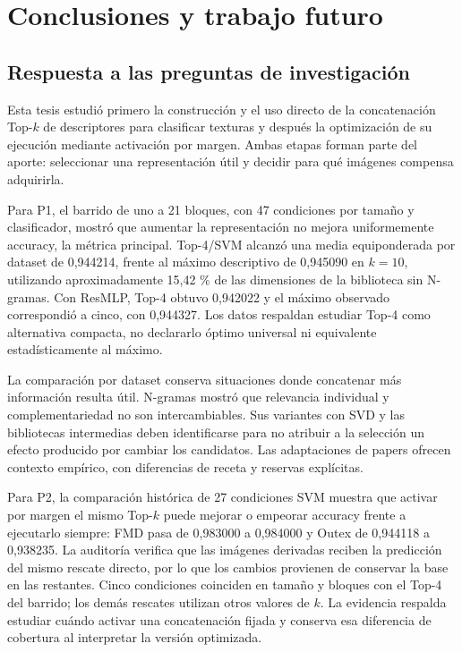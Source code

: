 \chapter{Conclusiones y trabajo futuro}\label{sec:conclusion}

\section{Respuesta a las preguntas de investigación}
Esta tesis estudió primero la construcción y el uso directo de la concatenación Top-\(k\) de descriptores para clasificar texturas y después la optimización de su ejecución mediante activación por margen. Ambas etapas forman parte del aporte: seleccionar una representación útil y decidir para qué imágenes compensa adquirirla.

Para P1, el barrido de uno a 21 bloques, con 47 condiciones por tamaño y clasificador, mostró que aumentar la representación no mejora uniformemente accuracy, la métrica principal. Top-4/SVM alcanzó una media equiponderada por dataset de 0,944214, frente al máximo descriptivo de 0,945090 en \(k=10\), utilizando aproximadamente 15,42 \% de las dimensiones de la biblioteca sin N-gramas. Con ResMLP, Top-4 obtuvo 0,942022 y el máximo observado correspondió a cinco, con 0,944327. Los datos respaldan estudiar Top-4 como alternativa compacta, no declararlo óptimo universal ni equivalente estadísticamente al máximo.

La comparación por dataset conserva situaciones donde concatenar más información resulta útil. N-gramas mostró que relevancia individual y complementariedad no son intercambiables. Sus variantes con SVD y las bibliotecas intermedias deben identificarse para no atribuir a la selección un efecto producido por cambiar los candidatos. Las adaptaciones de papers ofrecen contexto empírico, con diferencias de receta y reservas explícitas.

Para P2, la comparación histórica de 27 condiciones SVM muestra que activar por margen el mismo Top-\(k\) puede mejorar o empeorar accuracy frente a ejecutarlo siempre: FMD pasa de 0,983000 a 0,984000 y Outex de 0,944118 a 0,938235. La auditoría verifica que las imágenes derivadas reciben la predicción del mismo rescate directo, por lo que los cambios provienen de conservar la base en las restantes. Cinco condiciones coinciden en tamaño y bloques con el Top-4 del barrido; los demás rescates utilizan otros valores de \(k\). La evidencia respalda estudiar cuándo activar una concatenación fijada y conserva esa diferencia de cobertura al interpretar la versión optimizada.

